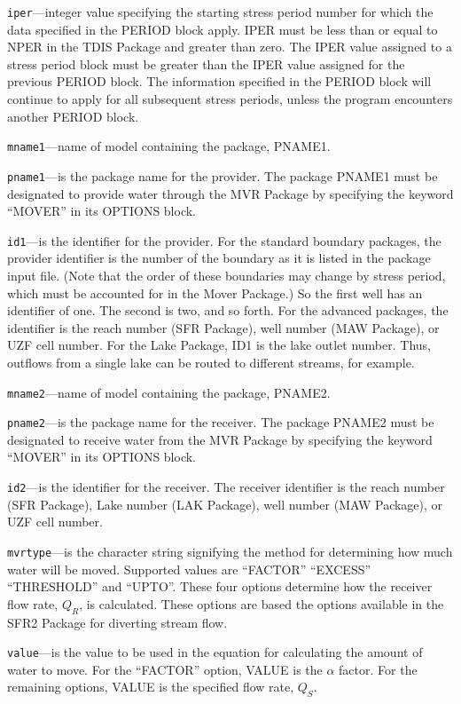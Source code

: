 \begin{description}
\item \texttt{iper}---integer value specifying the starting stress period number for which the data specified in the PERIOD block apply.  IPER must be less than or equal to NPER in the TDIS Package and greater than zero.  The IPER value assigned to a stress period block must be greater than the IPER value assigned for the previous PERIOD block.  The information specified in the PERIOD block will continue to apply for all subsequent stress periods, unless the program encounters another PERIOD block.

\item \texttt{mname1}---name of model containing the package, PNAME1.

\item \texttt{pname1}---is the package name for the provider.  The package PNAME1 must be designated to provide water through the MVR Package by specifying the keyword ``MOVER'' in its OPTIONS block.

\item \texttt{id1}---is the identifier for the provider.  For the standard boundary packages, the provider identifier is the number of the boundary as it is listed in the package input file. (Note that the order of these boundaries may change by stress period, which must be accounted for in the Mover Package.)  So the first well has an identifier of one.  The second is two, and so forth.  For the advanced packages, the identifier is the reach number (SFR Package), well number (MAW Package), or UZF cell number.  For the Lake Package, ID1 is the lake outlet number.  Thus, outflows from a single lake can be routed to different streams, for example.

\item \texttt{mname2}---name of model containing the package, PNAME2.

\item \texttt{pname2}---is the package name for the receiver.  The package PNAME2 must be designated to receive water from the MVR Package by specifying the keyword ``MOVER'' in its OPTIONS block.

\item \texttt{id2}---is the identifier for the receiver.  The receiver identifier is the reach number (SFR Package), Lake number (LAK Package), well number (MAW Package), or UZF cell number.

\item \texttt{mvrtype}---is the character string signifying the method for determining how much water will be moved.  Supported values are ``FACTOR'' ``EXCESS'' ``THRESHOLD'' and ``UPTO''.  These four options determine how the receiver flow rate, $Q_R$, is calculated.  These options are based the options available in the SFR2 Package for diverting stream flow.

\item \texttt{value}---is the value to be used in the equation for calculating the amount of water to move.  For the ``FACTOR'' option, VALUE is the $\alpha$ factor.  For the remaining options, VALUE is the specified flow rate, $Q_S$.

\end{description}

